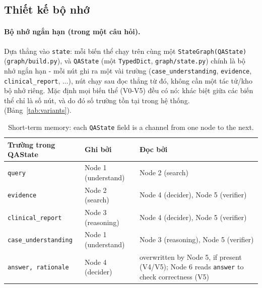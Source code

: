 \documentclass[11pt]{article}
\begin{document}
\FloatBarrier
\subsection{Thiết kế bộ nhớ}
\label{sec:memory}
\paragraph{Bộ nhớ ngắn hạn (trong một câu hỏi).} Dựa thẳng vào \texttt{state}: mỗi biến thể chạy trên
cùng một \texttt{StateGraph(QAState)} (\texttt{graph/build.py}), và \texttt{QAState} (một
\texttt{TypedDict}, \texttt{graph/state.py}) chính là bộ nhớ ngắn hạn - mỗi nút ghi ra một vài trường
(\texttt{case\_understanding}, \texttt{evidence}, \texttt{clinical\_report}, ...), nút chạy sau đọc
thẳng từ đó, không cần một tác tử/kho bộ nhớ riêng. Mặc định mọi biến thể (V0-V5) đều có nó:
khác biệt giữa các biến thể chỉ là số nút, và do đó số trường tồn tại trong hệ thống.
(Bảng~\ref{tab:variants}).

\begin{table}[h]
  \centering
  \caption{Short-term memory: each \texttt{QAState} field is a channel from one node to the next.}
  \label{tab:memory-design}
  \small
  \begin{tabular}{@{}p{}p{}p{}@{}}
    \toprule
    Trường trong QAState & Ghi bởi & Đọc bởi \\
    \midrule
    \texttt{query} & Node 1 (understand) & Node 2 (search) \\[3pt]
    \texttt{evidence} & Node 2 (search) & Node 4 (decider), Node 5 (verifier) \\[3pt]
    \texttt{clinical\_report} & Node 3 (reasoning) & Node 4 (decider), Node 5 (verifier) \\[3pt]
    \texttt{case\_understanding} & Node 1 (understand) & Node 3 (reasoning), Node 5 (verifier) \\[3pt]
    \texttt{answer, rationale} & Node 4 (decider) & overwritten by Node 5, if present (V4/V5); Node 6 reads \texttt{answer} to check correctness (V5) \\
    \bottomrule
  \end{tabular}
\end{table}
\end{document}

